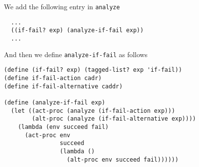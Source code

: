 \documentclass[a4paper,12pt]{article}
\begin{document}
We add the following entry in \lstinline!analyze!

\begin{lstlisting}
  ...
  ((if-fail? exp) (analyze-if-fail exp))
  ...
\end{lstlisting}

And then we define \lstinline!analyze-if-fail! as follows

\begin{lstlisting}
(define (if-fail? exp) (tagged-list? exp 'if-fail))
(define if-fail-action cadr)
(define if-fail-alternative caddr)

(define (analyze-if-fail exp)
  (let ((act-proc (analyze (if-fail-action exp)))
        (alt-proc (analyze (if-fail-alternative exp))))
    (lambda (env succeed fail)
      (act-proc env
                succeed
                (lambda ()
                  (alt-proc env succeed fail))))))
\end{lstlisting}
\end{document}
